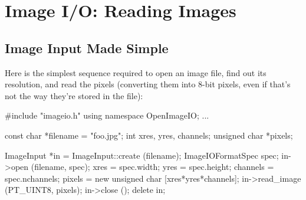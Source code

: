 \chapter{Image I/O: Reading Images}
\label{chap:imageinput}


\section{Image Input Made Simple}

Here is the simplest sequence required to open an image file, find
out its resolution, and read the pixels (converting them into
8-bit pixels, even if that's not the way they're stored in the file):

\begin{code}
    #include "imageio.h"
    using namespace OpenImageIO;
    ...

    const char *filename = "foo.jpg";
    int xres, yres, channels;
    unsigned char *pixels;

    ImageInput *in = ImageInput::create (filename);
    ImageIOFormatSpec spec;
    in->open (filename, spec);
    xres = spec.width;
    yres = spec.height;
    channels = spec.nchannels;
    pixels = new unsigned char [xres*yres*channels];
    in->read_image (PT_UINT8, pixels);
    in->close ();
    delete in;
\end{code}

